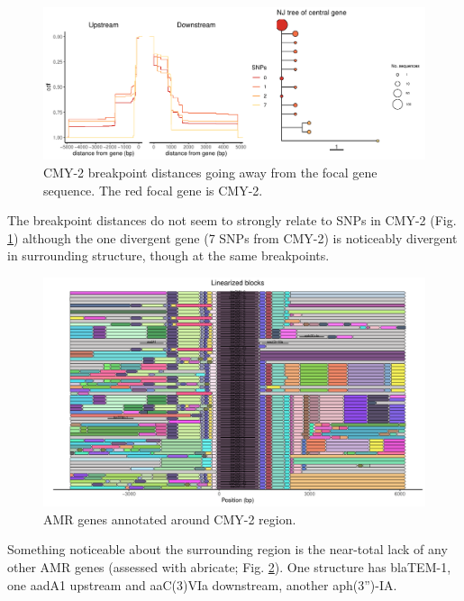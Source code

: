\documentclass[aps,rmp,preprint,superscriptaddress,10pt,twocolumn]{revtex4-1}
\begin{document}
\begin{figure}
    \centering
    \includegraphics[width=0.8\linewidth]{figs/CMY-2-mmseqs2-polish.all_u5000_d5000_pangraph.json.output_dists.csv.flanking-plot-output-focal-gene-seq.pdf}
    \caption{CMY-2 breakpoint distances going away from the focal gene sequence. The red focal gene is CMY-2.}
    \label{fig:CMY-2-pangraph-breakpoint-distances}
\end{figure}

The breakpoint distances do not seem to strongly relate to SNPs in CMY-2 (Fig. \ref{fig:CMY-2-pangraph-breakpoint-distances}) although the one divergent gene (7 SNPs from CMY-2) is noticeably divergent in surrounding structure, though at the same breakpoints. 

\begin{figure}
    \centering
    \includegraphics[width=0.8\linewidth]{figs/CMY-amr-genes.pdf}
    \caption{AMR genes annotated around CMY-2 region.}
    \label{fig:CMY-2-AMR-genes}
\end{figure}

Something noticeable about the surrounding region is the near-total lack of any other AMR genes (assessed with abricate; Fig. \ref{fig:CMY-2-AMR-genes}). One structure has blaTEM-1, one aadA1 upstream and aaC(3)VIa downstream, another aph(3'')-IA. 
\end{document}
